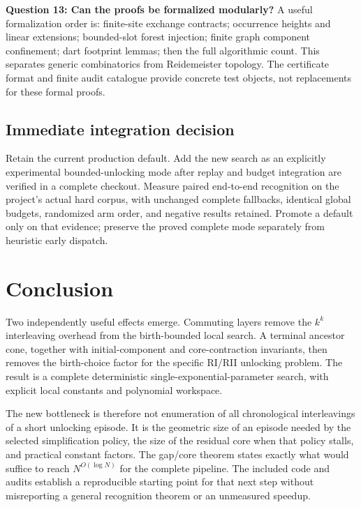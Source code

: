 \documentclass[11pt]{article}
\theoremstyle{definition}
\begin{document}
\textbf{Question 13: Can the proofs be formalized modularly?}
A useful formalization order is: finite-site exchange contracts; occurrence
heights and linear extensions; bounded-slot forest injection; finite graph
component confinement; dart footprint lemmas; then the full algorithmic
count. This separates generic combinatorics from Reidemeister topology.
The certificate format and finite audit catalogue provide concrete test
objects, not replacements for these formal proofs.

\subsection{Immediate integration decision}

Retain the current production default. Add the new search as an explicitly
experimental bounded-unlocking mode after replay and budget integration
are verified in a complete checkout. Measure paired end-to-end recognition
on the project's actual hard corpus, with unchanged complete fallbacks,
identical global budgets, randomized arm order, and negative results
retained. Promote a default only on that evidence; preserve the proved
complete mode separately from heuristic early dispatch.

\section{Conclusion}

Two independently useful effects emerge. Commuting layers remove the
$k^k$ interleaving overhead from the birth-bounded local search. A terminal
ancestor cone, together with initial-component and core-contraction
invariants, then removes the birth-choice factor for the specific RI/RII unlocking problem. The
result is a complete deterministic single-exponential-parameter search,
with explicit local constants and polynomial workspace.

The new bottleneck is therefore not enumeration of all chronological
interleavings of a short unlocking episode. It is the geometric size of
an episode needed by the selected simplification policy, the size of the
residual core when that policy stalls, and practical constant factors.
The gap/core theorem states exactly what would suffice to reach
$N^{O(\log N)}$ for the complete pipeline. The included code and audits
establish a reproducible starting point for that next step without
misreporting a general recognition theorem or an unmeasured speedup.

\appendix
\end{document}
